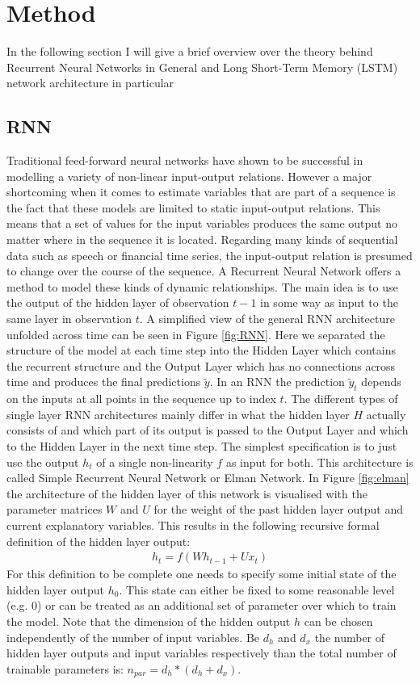 \section{Method}\label{Sec:Method}
In the following section I will give a brief overview over the theory behind Recurrent Neural Networks in General and Long Short-Term Memory (LSTM) network architecture in particular
\subsection{RNN}
Traditional feed-forward neural networks have shown to be successful in modelling a variety of non-linear input-output relations. However a major shortcoming when it comes to estimate variables that are part of a sequence is the fact that these models are limited to static input-output relations. This means that a set of values for the input variables produces the same output no matter where in the sequence it is located. Regarding many kinds of sequential data such as speech or financial time series, the input-output relation is presumed to change over the course of the sequence. A Recurrent Neural Network offers a method to model these kinds of dynamic relationships. The main idea is to use the output of the hidden layer of observation $t-1$ in some way as input to the same layer in observation $t$. A simplified view of the general RNN architecture unfolded across time can be seen in Figure \ref{fig:RNN}. Here we separated the structure of the model at each time step into the Hidden Layer which contains the recurrent structure and the Output Layer which has no connections across time and produces the final predictions $\tilde{y}$. In an RNN the prediction $\tilde{y}_t$ depends on the inputs at all points in the sequence up to index $t$.
The different types of single layer RNN architectures mainly differ in what the hidden layer $H$ actually consists of and which part of its output is passed to the Output Layer and which to the Hidden Layer in the next time step. The simplest specification is to just use the output $h_t$ of a single non-linearity $f$  as input for both. This architecture is called Simple Recurrent Neural Network or Elman Network. In Figure \ref{fig:elman} the architecture of the hidden layer of this network is visualised with the parameter matrices $W$ and $U$ for the weight of the past hidden layer output and current explanatory variables. This results in the following recursive formal definition of the hidden layer output:
\begin{align*}
h_t = f(Wh_{t-1} + Ux_t)
\end{align*}
For this definition to be complete one needs to specify some initial state of the hidden layer output $h_0$. This state can either be fixed to some reasonable level (e.g. 0) or can be treated as an additional set of parameter over which to train the model.
Note that the dimension of the hidden output $h$ can be chosen independently of the number of input variables. Be $d_h$ and $d_x$ the number of hidden layer outputs and input variables respectively than the total number of trainable parameters is: $n_{par} = d_h * (d_h + d_x)$.

